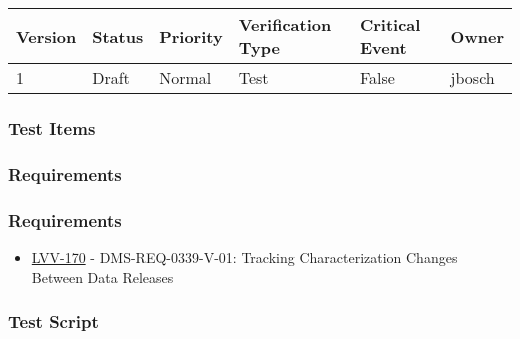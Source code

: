 \begin{longtable}[]{@{}llllll@{}}
\toprule
Version & Status & Priority & Verification Type & Critical Event &
Owner\tabularnewline
\midrule
\endhead
1 & Draft & Normal & Test & False & jbosch\tabularnewline
\bottomrule
\end{longtable}

\hypertarget{test-items-14}{%
\subsubsection{Test Items}\label{test-items-14}}

\hypertarget{requirements-28}{%
\subsubsection{Requirements}\label{requirements-28}}

\hypertarget{requirements-29}{%
\subsubsection{Requirements}\label{requirements-29}}

\begin{itemize}
\tightlist
\item
  \href{https://jira.lsstcorp.org/browse/LVV-170}{LVV-170} -
  DMS-REQ-0339-V-01: Tracking Characterization Changes Between Data
  Releases
\end{itemize}

\hypertarget{test-script-14}{%
\subsubsection{Test Script}\label{test-script-14}}

